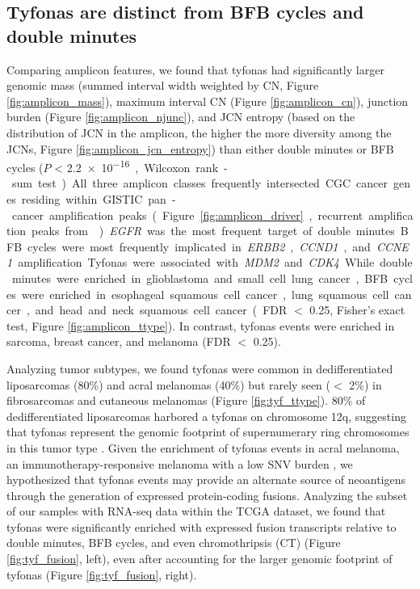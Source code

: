 \documentclass[phd,tocprelim]{cornell}
\begin{document}
\subsection*{Tyfonas are distinct from BFB cycles and double minutes}
Comparing amplicon features, we found that tyfonas had significantly larger genomic mass (summed interval width weighted by CN, Figure \ref{fig:amplicon_mass}), maximum interval CN (Figure \ref{fig:amplicon_cn}), junction burden (Figure \ref{fig:amplicon_njunc}), and JCN entropy (based on the distribution of JCN in the amplicon, the higher the more diversity among the JCNs, Figure \ref{fig:amplicon_jcn_entropy}) than either double minutes or BFB cycles ($P$ < \SI{2.2e-16}, Wilcoxon rank-sum test).  All three amplicon classes frequently intersected CGC cancer genes residing within GISTIC pan-cancer amplification peaks (Figure \ref{fig:amplicon_driver}, recurrent amplification peaks from \cite{Zack:2013f1f}). \textit{EGFR} was the most frequent target of double minutes.  BFB cycles were most frequently implicated in \textit{ERBB2}, \textit{CCND1}, and \textit{CCNE1} amplification. Tyfonas were associated with \textit{MDM2} and \textit{CDK4}. While double minutes were enriched in glioblastoma and small cell lung cancer, BFB cycles were enriched in esophageal squamous cell cancer, lung squamous cell cancer, and head and neck squamous cell cancer (FDR $<$ 0.25, Fisher's exact test, Figure \ref{fig:amplicon_ttype}). In contrast, tyfonas events were enriched in sarcoma, breast cancer, and melanoma (FDR $<$ 0.25).




Analyzing tumor subtypes, we found tyfonas were common in dedifferentiated liposarcomas (80\%) and acral melanomas (40\%) but rarely seen ($<$ 2\%) in fibrosarcomas and cutaneous melanomas (Figure \ref{fig:tyf_ttype}).    80\% of dedifferentiated liposarcomas harbored a tyfonas on chromosome 12q, suggesting that tyfonas represent the genomic footprint of supernumerary ring chromosomes in this tumor type \cite{Reimann2008-tj}. Given the enrichment of tyfonas events in acral melanoma, an immunotherapy-responsive melanoma with a low SNV burden \cite{Shoushtari2016-de}, we hypothesized that tyfonas events may provide an alternate source of neoantigens through the generation of expressed protein-coding fusions.  Analyzing the subset of our samples with RNA-seq data within the TCGA dataset, we found that tyfonas were significantly enriched with expressed fusion transcripts relative to double minutes, BFB cycles, and even chromothripsis (CT) (Figure \ref{fig:tyf_fusion}, left), even after accounting for the larger genomic footprint of tyfonas (Figure \ref{fig:tyf_fusion}, right).
\end{document}
